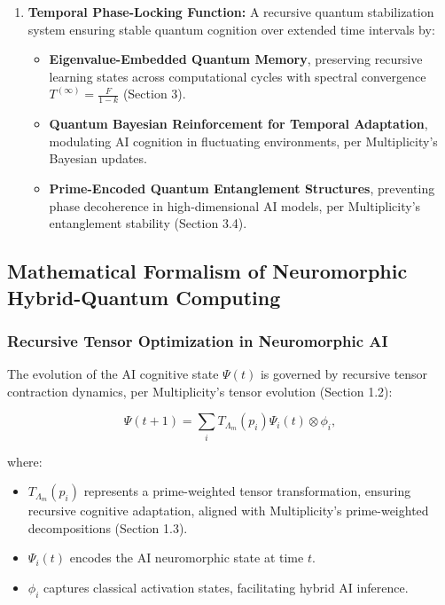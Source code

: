 \documentclass[12pt]{article}
\begin{document}
\begin{enumerate}
    \item \textbf{Temporal Phase-Locking Function:} A recursive quantum stabilization system ensuring stable quantum cognition over extended time intervals by:
    \begin{itemize}
        \item \textbf{Eigenvalue-Embedded Quantum Memory}, preserving recursive learning states across computational cycles with spectral convergence \(T^{(\infty)} = \frac{F}{1 - k}\) (Section 3).
        \item \textbf{Quantum Bayesian Reinforcement for Temporal Adaptation}, modulating AI cognition in fluctuating environments, per Multiplicity’s Bayesian updates.
        \item \textbf{Prime-Encoded Quantum Entanglement Structures}, preventing phase decoherence in high-dimensional AI models, per Multiplicity’s entanglement stability (Section 3.4).
    \end{itemize}
\end{enumerate}

\subsection{Mathematical Formalism of Neuromorphic Hybrid-Quantum Computing}

\subsubsection{Recursive Tensor Optimization in Neuromorphic AI}

The evolution of the AI cognitive state \(\Psi(t)\) is governed by recursive tensor contraction dynamics, per Multiplicity’s tensor evolution (Section 1.2):

\begin{equation}
    \Psi(t+1) = \sum_{i} T_{\Lambda_m}(p_i) \Psi_i(t) \otimes \phi_i,
\end{equation}

where:
\begin{itemize}
    \item \(T_{\Lambda_m}(p_i)\) represents a prime-weighted tensor transformation, ensuring recursive cognitive adaptation, aligned with Multiplicity’s prime-weighted decompositions (Section 1.3).
    \item \(\Psi_i(t)\) encodes the AI neuromorphic state at time \(t\).
    \item \(\phi_i\) captures classical activation states, facilitating hybrid AI inference.
\end{itemize}
\end{document}
